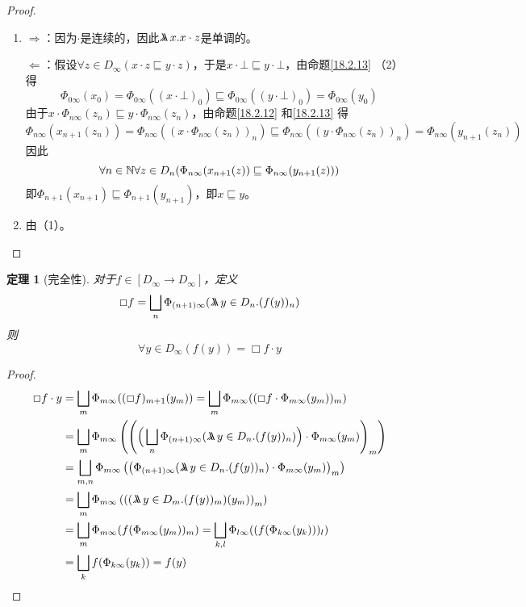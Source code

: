 \documentclass[11pt]{article}
\newtheorem{theorem}{定理}[section]
\begin{document}
\begin{proof}
\begin{enumerate}
\item \(\Rightarrow\)：因为\(\cdot\)是连续的，因此\(\metalambda x.x\cdot z\)是单调的。

\(\Leftarrow\)：假设\(\forall z\in D_\infty(x\cdot z\sqsubseteq y\cdot z)\)，于是\(x\cdot\bot\sqsubseteq y\cdot\bot\)，由命题\ref{18.2.13} （2）得
\begin{equation*}
\Phi_{0\infty}(x_0)=\Phi_{0\infty}((x\cdot\bot)_0)\sqsubseteq\Phi_{0\infty}((y\cdot\bot)_0)=\Phi_{0\infty}(y_0)
\end{equation*}
由于\(x\cdot\Phi_{n\infty}(z_n)\sqsubseteq y\cdot\Phi_{n\infty}(z_n)\)，由命题\ref{18.2.12} 和\ref{18.2.13} 得
\begin{equation*}
\Phi_{n\infty}(x_{n+1}(z_n))=\Phi_{n\infty}((x\cdot\Phi_{n\infty}(z_n))_n)
\sqsubseteq\Phi_{n\infty}((y\cdot\Phi_{n\infty}(z_n))_n)=\Phi_{n\infty}(y_{n+1}(z_n))
\end{equation*}
因此
\begin{equation*}
\forall n\in\mathbb{N}\forall z\in D_n(\Phi_{n\infty}(x_{n+1}(z))\sqsubseteq\Phi_{n\infty}(y_{n+1}(z)))
\end{equation*}
即\(\Phi_{n+1}(x_{n+1})\sqsubseteq\Phi_{n+1}(y_{n+1})\)，即\(x\sqsubseteq y\)。
\item 由（1）。
\end{enumerate}
\end{proof}

\begin{theorem}[完全性]
\label{18.2.15}
对于\(f\in[D_\infty\to D_\infty]\)，定义
\begin{equation*}
\Box f=\bigsqcup_n\Phi_{(n+1)\infty}(\metalambda y\in D_n.(f(y))_n)
\end{equation*}
则
\begin{equation*}
\forall y\in D_\infty(f(y))=\Box f\cdot y
\end{equation*}
\end{theorem}

\begin{proof}
\begin{align*}
\Box f\cdot y&=\bigsqcup_m\Phi_{m\infty}((\Box f)_{m+1}(y_m))=\bigsqcup_m\Phi_{m\infty}((\Box f\cdot\Phi_{m\infty}(y_m))_m)\\
&=\bigsqcup_m\Phi_{m\infty}\left( \left(
\Big(\bigsqcup_n\Phi_{(n+1)\infty}(
\metalambda y\in D_n.(f(y))_n)\Big)\cdot\Phi_{m\infty}(y_m)  \right)_m \right)\\
&=\bigsqcup_{m,n}\Phi_{m\infty}\left(
\left(
\Phi_{(n+1)\infty}(\metalambda y\in D_n.(f(y))_n)\cdot\Phi_{m\infty}(y_m)  \right)_m \right)\\
&=\bigsqcup_m\Phi_{m\infty}\left( \left(
(\metalambda y\in D_m.(f(y))_m)(y_m)  \right)_m \right)\\
&=\bigsqcup_m\Phi_{m\infty}(f(\Phi_{m\infty}(y_m))_m)=\bigsqcup_{k,l}\Phi_{l\infty}((f(\Phi_{k\infty}(y_k)))_l)\\
&=\bigsqcup_k f(\Phi_{k\infty}(y_k))=f(y)
\end{align*}
\end{proof}
\end{document}
